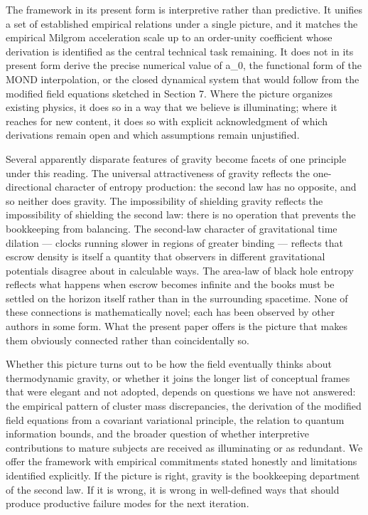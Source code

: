 \documentclass[11pt]{article}
\begin{document}
The framework in its present form is interpretive rather than predictive. It unifies a set of established empirical relations under a single picture, and it matches the empirical Milgrom acceleration scale up to an order-unity coefficient whose derivation is identified as the central technical task remaining. It does not in its present form derive the precise numerical value of a\_0, the functional form of the MOND interpolation, or the closed dynamical system that would follow from the modified field equations sketched in Section 7. Where the picture organizes existing physics, it does so in a way that we believe is illuminating; where it reaches for new content, it does so with explicit acknowledgment of which derivations remain open and which assumptions remain unjustified.

Several apparently disparate features of gravity become facets of one principle under this reading. The universal attractiveness of gravity reflects the one-directional character of entropy production: the second law has no opposite, and so neither does gravity. The impossibility of shielding gravity reflects the impossibility of shielding the second law: there is no operation that prevents the bookkeeping from balancing. The second-law character of gravitational time dilation --- clocks running slower in regions of greater binding --- reflects that escrow density is itself a quantity that observers in different gravitational potentials disagree about in calculable ways. The area-law of black hole entropy reflects what happens when escrow becomes infinite and the books must be settled on the horizon itself rather than in the surrounding spacetime. None of these connections is mathematically novel; each has been observed by other authors in some form. What the present paper offers is the picture that makes them obviously connected rather than coincidentally so.

Whether this picture turns out to be how the field eventually thinks about thermodynamic gravity, or whether it joins the longer list of conceptual frames that were elegant and not adopted, depends on questions we have not answered: the empirical pattern of cluster mass discrepancies, the derivation of the modified field equations from a covariant variational principle, the relation to quantum information bounds, and the broader question of whether interpretive contributions to mature subjects are received as illuminating or as redundant. We offer the framework with empirical commitments stated honestly and limitations identified explicitly. If the picture is right, gravity is the bookkeeping department of the second law. If it is wrong, it is wrong in well-defined ways that should produce productive failure modes for the next iteration.
\end{document}
